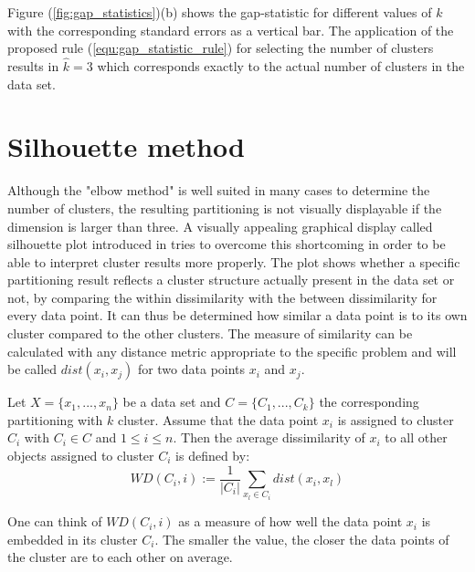 Figure (\ref{fig:gap_statistics})(b) shows the gap-statistic for different values of $k$ with the corresponding standard errors as a vertical bar. The application of the proposed rule (\ref{equ:gap_statistic_rule}) for selecting the number of clusters results in $\hat{k} = 3$ which corresponds exactly to the actual number of clusters in the data set. 

\section{Silhouette method}\label{sec:silhouette}

Although the "elbow method" is well suited in many cases to determine the number of clusters, the resulting partitioning is not visually displayable if the dimension is larger than three. A visually appealing graphical display called silhouette plot introduced in \cite{rousseeuw1987silhouettes} tries to overcome this shortcoming in order to be able to interpret cluster results more properly. The plot shows whether a specific partitioning result reflects a cluster structure actually present in the data set or not, by comparing the within dissimilarity with the between dissimilarity for every data point. It can thus be determined how similar a data point is to its own cluster compared to the other clusters. The measure of similarity can be calculated with any distance metric appropriate to the specific problem and will be called $dist(x_i, x_j)$ for two data points $x_i$ and $x_j$.

\begin{definition}
	Let $X=\{x_1, ..., x_n\}$ be a data set and $C=\{C_1, ..., C_k\}$ the corresponding partitioning with $k$ cluster. Assume that the data point $x_i$ is assigned to cluster $C_i$ with $C_i \in C$ and $1 \leq i \leq n$. Then the average dissimilarity of $x_i$ to all other objects assigned to cluster $C_i$ is defined by: 
	\begin{equation*}\label{equ:dist_A}
	WD(C_i,i) := \frac{1}{|C_i|}\sum_{x_l \in C_i} dist(x_i, x_l)
	\end{equation*}
\end{definition}

One can think of $WD(C_i,i)$ as a measure of how well the data point $x_i$ is embedded in its cluster $C_i$. The smaller the value, the closer the data points of the cluster are to each other on average. 

